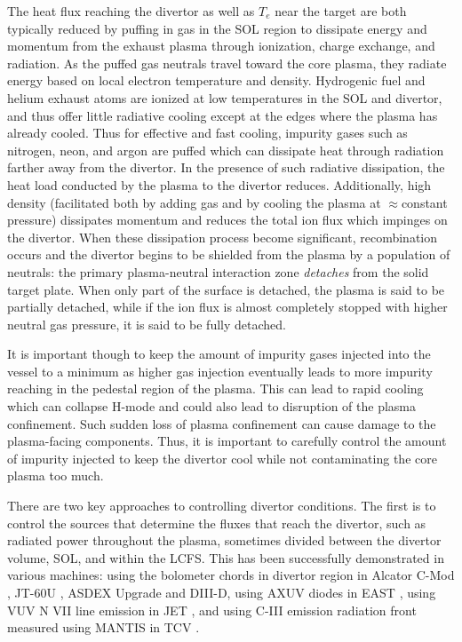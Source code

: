 The heat flux reaching the divertor as well as $T_e$ near the target are both typically reduced by puffing in gas in the \ac{SOL} region to dissipate energy and momentum from the exhaust plasma through ionization, charge exchange, and radiation.
As the puffed gas neutrals travel toward the core plasma, they radiate energy based on local electron temperature and density.
Hydrogenic fuel and helium exhaust atoms are ionized at low temperatures in the \ac{SOL} and divertor, and thus offer little radiative cooling except at the edges where the plasma has already cooled.
Thus for effective and fast cooling, impurity gases such as nitrogen, neon, and argon are puffed which can dissipate heat through radiation farther away from the divertor.
In the presence of such radiative dissipation, the heat load conducted by the plasma to the divertor reduces.
Additionally, high density (facilitated both by adding gas and by cooling the plasma at $\approx$constant pressure) dissipates momentum and reduces the total ion flux which impinges on the divertor.
When these dissipation process become significant, recombination occurs and the divertor begins to be shielded from the plasma by a population of neutrals: the primary plasma-neutral interaction zone \emph{detaches} from the solid target plate.
When only part of the surface is detached, the plasma is said to be partially detached, while if the ion flux is almost completely stopped with higher neutral gas pressure, it is said to be fully detached.

It is important though to keep the amount of impurity gases injected into the vessel to a minimum as higher gas injection eventually leads to more impurity reaching in the pedestal region of the plasma.
This can lead to rapid cooling which can collapse H-mode and could also lead to disruption of the plasma confinement.
Such sudden loss of plasma confinement can cause damage to the plasma-facing components.
Thus, it is important to carefully control the amount of impurity injected to keep the divertor cool while not contaminating the core plasma too much.

There are two key approaches to controlling divertor conditions.
The first is to control the sources that determine the fluxes that reach the divertor, such as radiated power throughout the plasma, sometimes divided between the divertor volume, \ac{SOL}, and within the \ac{LCFS}.
This has been successfully demonstrated in various machines:
using the bolometer chords in divertor region in Alcator C-Mod \cite{Goetz_1999_POP}, JT-60U \cite{Asakura_2009_NF}, ASDEX Upgrade \cite{Kallenbach_2012_NF} and DIII-D\cite{Eldon_2019_NME},
using AXUV diodes in EAST \cite{Wu_2018_NF},
using VUV N VII line emission in JET \cite{Maddison_2011_NF}, and
using C-III emission radiation front measured using MANTIS in TCV \cite{Ravensbergen_2021_NC}.

